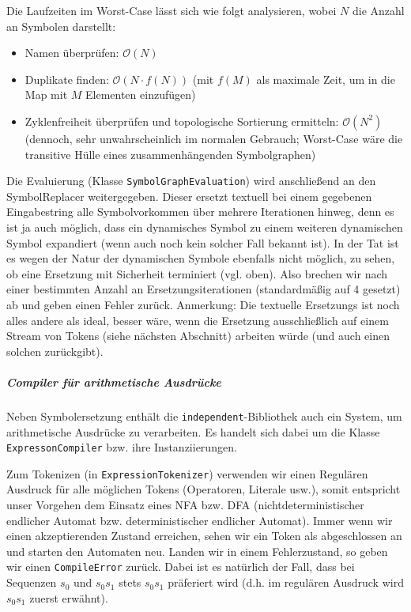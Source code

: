 \pagebreak
Die Laufzeiten im Worst-Case lässt sich wie folgt analysieren, wobei $N$ die
Anzahl an Symbolen darstellt:

\begin{itemize}
    \item Namen überprüfen: $\mathcal{O}(N)$

    \item Duplikate finden: $\mathcal{O}(N \cdot f(N))$ (mit $f(M)$ als maximale
    Zeit, um in die Map mit $M$ Elementen einzufügen)

    \item Zyklenfreiheit überprüfen und topologische Sortierung ermitteln:
    $\mathcal{O}(N^2)$ (dennoch, sehr unwahrscheinlich im normalen Gebrauch;
    Worst-Case wäre die transitive Hülle eines zusammenhängenden Symbolgraphen)
\end{itemize}

Die Evaluierung (Klasse \texttt{SymbolGraphEvaluation}) wird anschließend an den
SymbolReplacer weitergegeben. Dieser ersetzt textuell bei einem gegebenen
Eingabestring alle Symbolvorkommen über mehrere Iterationen hinweg, denn es ist
ja auch möglich, dass ein dynamisches Symbol zu einem weiteren dynamischen
Symbol expandiert (wenn auch noch kein solcher Fall bekannt ist). In der Tat ist
es wegen der Natur der dynamischen Symbole ebenfalls nicht möglich, zu sehen, ob
eine Ersetzung mit Sicherheit terminiert (vgl. oben). Also brechen wir nach
einer bestimmten Anzahl an Ersetzungsiterationen (standardmäßig auf 4 gesetzt)
ab und geben einen Fehler zurück. Anmerkung: Die textuelle Ersetzungs ist noch
alles andere als ideal, besser wäre, wenn die Ersetzung ausschließlich auf einem
Stream von Tokens (siehe nächsten Abschnitt) arbeiten würde (und auch einen
solchen zurückgibt).

\subparagraph{Compiler für arithmetische Ausdrücke} Neben Symbolersetzung
enthält die \texttt{independent}-Bibliothek auch ein System, um arithmetische
Ausdrücke zu verarbeiten. Es handelt sich dabei um die Klasse
\texttt{ExpressonCompiler} bzw. ihre Instanziierungen.

Zum Tokenizen (in \texttt{ExpressionTokenizer}) verwenden wir einen Regulären
Ausdruck für alle möglichen Tokens (Operatoren, Literale usw.), somit entspricht
unser Vorgehen dem Einsatz eines NFA bzw. DFA (nichtdeterministischer endlicher
Automat bzw. deterministischer endlicher Automat). Immer wenn wir einen
akzeptierenden Zustand erreichen, sehen wir ein Token als abgeschlossen an und
starten den Automaten neu. Landen wir in einem Fehlerzustand, so geben wir einen
\texttt{CompileError} zurück. Dabei ist es natürlich der Fall, dass bei
Sequenzen $s_0$ und $s_0s_1$ stets $s_0s_1$ präferiert wird (d.h. im
regulären Ausdruck wird $s_0s_1$ zuerst erwähnt).

